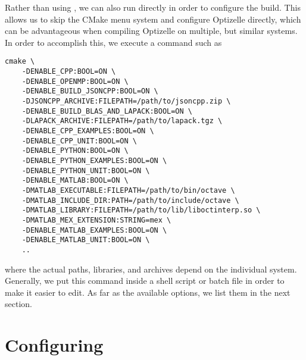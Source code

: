 \documentclass{report}
\makeatletter
\DeclareRobustCommand*{\textct}[1]{%
  \begingroup\@activeus\scantokens{\texttt{#1}\endinput}\endgroup}
\makeatother
\begin{document}
        Rather than using \textct{ccmake}, we can also run \textct{cmake} directly in order to configure the build.  This allows us to skip the CMake menu system and configure Optizelle directly, which can be advantageous when compiling Optizelle on multiple, but similar systems.  In order to accomplish this, we execute a command such as
\begin{center}\begin{verbatim}
cmake \
    -DENABLE_CPP:BOOL=ON \
    -DENABLE_OPENMP:BOOL=ON \
    -DENABLE_BUILD_JSONCPP:BOOL=ON \
    -DJSONCPP_ARCHIVE:FILEPATH=/path/to/jsoncpp.zip \
    -DENABLE_BUILD_BLAS_AND_LAPACK:BOOL=ON \
    -DLAPACK_ARCHIVE:FILEPATH=/path/to/lapack.tgz \
    -DENABLE_CPP_EXAMPLES:BOOL=ON \
    -DENABLE_CPP_UNIT:BOOL=ON \
    -DENABLE_PYTHON:BOOL=ON \
    -DENABLE_PYTHON_EXAMPLES:BOOL=ON \
    -DENABLE_PYTHON_UNIT:BOOL=ON \
    -DENABLE_MATLAB:BOOL=ON \
    -DMATLAB_EXECUTABLE:FILEPATH=/path/to/bin/octave \
    -DMATLAB_INCLUDE_DIR:PATH=/path/to/include/octave \
    -DMATLAB_LIBRARY:FILEPATH=/path/to/lib/liboctinterp.so \
    -DMATLAB_MEX_EXTENSION:STRING=mex \
    -DENABLE_MATLAB_EXAMPLES:BOOL=ON \
    -DENABLE_MATLAB_UNIT:BOOL=ON \
    ..
\end{verbatim}\end{center}
where the actual paths, libraries, and archives depend on the individual system.  Generally, we put this command inside a shell script or batch file in order to make it easier to edit.  As far as the available options, we list them in the next section.

\section{Configuring}
\end{document}
